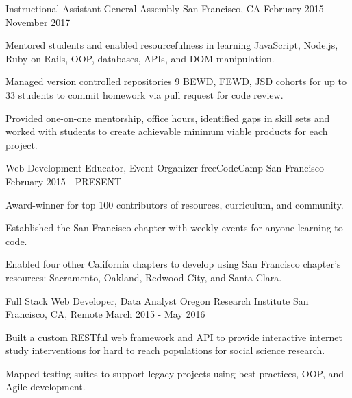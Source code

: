 \begin{cventries}
  \cventry
    {Instructional Assistant} %
    {General Assembly} %
    {San Francisco, CA} %
    {February 2015 - November 2017} %
    {
      \begin{cvitems} %
        \item {Mentored students and enabled resourcefulness in learning JavaScript, Node.js, Ruby on Rails, OOP, databases, APIs, and DOM manipulation.}
        \item {Managed version controlled repositories 9 BEWD, FEWD, JSD cohorts for up to 33 students to commit homework via pull request for code review.}
        \item {Provided one-on-one mentorship, office hours, identified gaps in skill sets and worked with students to create achievable minimum viable products for each project.}
      \end{cvitems}
    }

  \cventry
    {Web Development Educator, Event Organizer} %
    {freeCodeCamp} %
    {San Francisco} %
    {February 2015 - PRESENT} %
    {
      \begin{cvitems} %
        \item {Award-winner for top 100 contributors of resources, curriculum, and community.}
        \item {Established the San Francisco chapter with weekly events for anyone learning to code.}
        \item {Enabled four other California chapters to develop using San Francisco chapter's resources: Sacramento, Oakland, Redwood City, and Santa Clara.}
      \end{cvitems}
    }

  \cventry
    {Full Stack Web Developer, Data Analyst} %
    {Oregon Research Institute} %
    {San Francisco, CA, Remote} %
    {March 2015 - May 2016} %
    {
      \begin{cvitems} %
        \item {Built a custom RESTful web framework and API to provide interactive internet study interventions for hard to reach populations for social science research.}
        \item {Mapped testing suites to support legacy projects using best practices, OOP, and Agile development.}
      \end{cvitems}
    }

\end{cventries}

